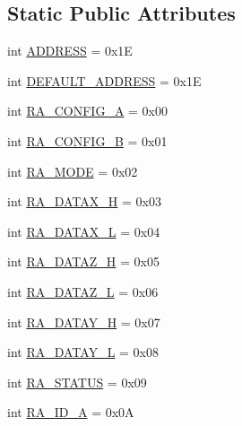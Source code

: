 \subsection*{Static Public Attributes}
\begin{DoxyCompactItemize}
\item 
int \hyperlink{classconcretesensor_1_1hmc5883l_1_1HMC5883L_ae7377fb075817476d3467821a5a643b3}{A\+D\+D\+R\+E\+S\+S} = 0x1\+E
\item 
int \hyperlink{classconcretesensor_1_1hmc5883l_1_1HMC5883L_abe468ec9b7532d651c071b1a32e235d6}{D\+E\+F\+A\+U\+L\+T\+\_\+\+A\+D\+D\+R\+E\+S\+S} = 0x1\+E
\item 
int \hyperlink{classconcretesensor_1_1hmc5883l_1_1HMC5883L_a8698a77ae6b7f4d0553bcb4dfa5d566b}{R\+A\+\_\+\+C\+O\+N\+F\+I\+G\+\_\+\+A} = 0x00
\item 
int \hyperlink{classconcretesensor_1_1hmc5883l_1_1HMC5883L_a95ee89542eceaf37f259dc00163ee76a}{R\+A\+\_\+\+C\+O\+N\+F\+I\+G\+\_\+\+B} = 0x01
\item 
int \hyperlink{classconcretesensor_1_1hmc5883l_1_1HMC5883L_a973abe73389914c435c1db6599963b1c}{R\+A\+\_\+\+M\+O\+D\+E} = 0x02
\item 
int \hyperlink{classconcretesensor_1_1hmc5883l_1_1HMC5883L_aedbb6b7a448a7d7b6f0b3873ae14119f}{R\+A\+\_\+\+D\+A\+T\+A\+X\+\_\+\+H} = 0x03
\item 
int \hyperlink{classconcretesensor_1_1hmc5883l_1_1HMC5883L_a05464309e0a063afd462ebc409b7fdd9}{R\+A\+\_\+\+D\+A\+T\+A\+X\+\_\+\+L} = 0x04
\item 
int \hyperlink{classconcretesensor_1_1hmc5883l_1_1HMC5883L_a9bb3cf337937e45fa7624524489ad34a}{R\+A\+\_\+\+D\+A\+T\+A\+Z\+\_\+\+H} = 0x05
\item 
int \hyperlink{classconcretesensor_1_1hmc5883l_1_1HMC5883L_a2a4bac8c94b5edda1ce3ebb6d71de9d7}{R\+A\+\_\+\+D\+A\+T\+A\+Z\+\_\+\+L} = 0x06
\item 
int \hyperlink{classconcretesensor_1_1hmc5883l_1_1HMC5883L_a5bd30aaccc674bc29e19e31ec514c221}{R\+A\+\_\+\+D\+A\+T\+A\+Y\+\_\+\+H} = 0x07
\item 
int \hyperlink{classconcretesensor_1_1hmc5883l_1_1HMC5883L_ac56afe3e7a7157f9a2b7b1492db0a195}{R\+A\+\_\+\+D\+A\+T\+A\+Y\+\_\+\+L} = 0x08
\item 
int \hyperlink{classconcretesensor_1_1hmc5883l_1_1HMC5883L_aa0dc9775d6066c08d8305f63a9a252e3}{R\+A\+\_\+\+S\+T\+A\+T\+U\+S} = 0x09
\item 
int \hyperlink{classconcretesensor_1_1hmc5883l_1_1HMC5883L_ac115672ad6878a61b3e6b140c2003b4a}{R\+A\+\_\+\+I\+D\+\_\+\+A} = 0x0\+A

\end{DoxyCompactItemize}
